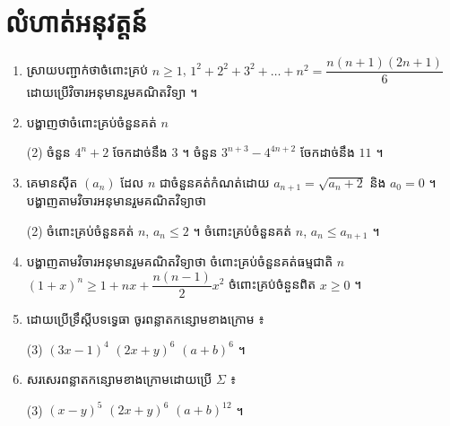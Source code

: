 \section*{លំហាត់អនុវត្តន៍}
\begin{enumerate}[1]
  \item ស្រាយបញ្ជាក់ថាចំពោះគ្រប់ $n \ge 1$, $1^2 + 2^2 + 3^2 + \ldots + n^2 = \dfrac{n(n + 1)(2n + 1)}{6}$ ដោយប្រើវិចារអនុមានរួមគណិតវិទ្យា ។
  \item បង្ហាញថាចំពោះគ្រប់ចំនួនគត់ $n$
  \begin{tasks}(2)
    \task ចំនួន $4^n + 2$ ចែកដាច់នឹង $3$ ។
    \task ចំនួន $3^{n+3} - 4^{4n+2}$ ចែកដាច់នឹង $11$ ។
  \end{tasks}
  \item គេមានស៊ីត $(a_n)$ ដែល $n$ ជាចំនួនគត់កំណត់ដោយ $a_{n+1} = \sqrt{a_n + 2}$ និង $a_0 = 0$ ។ បង្ហាញតាមវិចារអនុមានរួមគណិតវិទ្យាថា
  \begin{tasks}(2)
    \task ចំពោះគ្រប់ចំនួនគត់ $n$, $a_n \le 2$ ។
    \task ចំពោះគ្រប់ចំនួនគត់ $n$, $a_n \le a_{n+1}$ ។
  \end{tasks}
  \item បង្ហាញតាមវិចារអនុមានរួមគណិតវិទ្យាថា ចំពោះគ្រប់ចំនួនគត់ធម្មជាតិ $n$ \quad $(1 + x)^n \ge 1 + nx + \dfrac{n(n - 1)}{2}x^2$ ចំពោះគ្រប់ចំនួនពិត $x \ge 0$ ។
  \item ដោយប្រើទ្រឹស្តីបទទ្វេធា ចូរពន្លាតកន្សោមខាងក្រោម ៖
  \begin{tasks}(3)
    \task $(3x - 1)^4$
    \task $(2x + y)^6$
    \task $(a + b)^6$ ។
  \end{tasks}
  \item សរសេរពន្លាតកន្សោមខាងក្រោមដោយប្រើ $\Sigma$ ៖
  \begin{tasks}(3)
    \task $(x - y)^5$
    \task $(2x + y)^6$
    \task $(a + b)^{12}$ ។
  \end{tasks}
\end{enumerate}
